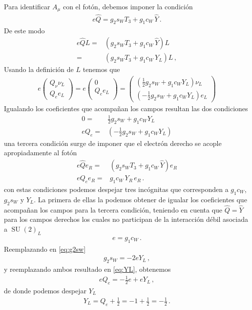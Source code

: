 Para identificar $A_{\mu}$ con el fotón, debemos imponer la condición
\begin{align}
  \label{eq:relgn}
e\widehat{Q}=g_2 s_W T_3+{g_1}c_W\,\widehat{Y}\,.
\end{align}
De este modo
\begin{align}
  e\widehat{Q}L =& \left(g_2 s_W T_3+{g_1}c_W\,\widehat{Y}\right) L \nonumber\\
=& \left(g_2 s_W T_3+{g_1}c_W\,Y_L\right) L \,,
\end{align}
Usando la definición de $L$ tenemos que
\begin{align}
 e
  \begin{pmatrix}
    Q_{\nu} \nu_L\\
       Q_e e_L 
 \end{pmatrix}=
    e\begin{pmatrix}
   0\\
      Q_e e_L \\
  \end{pmatrix}=
  \begin{pmatrix}
   \left( \frac{1}{2}g_2 s_W +g_1 c_W Y_L \right) \nu_L\\ 
 \left(  -\frac{1}{2}g_2 s_W +g_1 c_W Y_L \right) e_L
  \end{pmatrix}
\end{align}
Igualando los coeficientes que acompañan los campos resultan las dos condiciones
\begin{align}
  \label{eq:g2sw}
  0= & \frac{1}{2}g_2 s_W +g_1 c_W Y_L  \\
    \label{eq:YL}
e Q_e=& \left(  -\frac{1}{2}g_2 s_W +g_1 c_W Y_L \right)
\end{align}
una tercera condición surge de imponer que el electrón derecho se acople apropiadamente al fotón
\begin{align}
  \label{eq:erel}
 e\widehat{Q} e_R =& \left(g_2 s_W T_3+{g_1}c_W\,\widehat{Y}\right) e_R\nonumber\\  
e Q_e e_R=& g_1 c_W\,Y_R \, e_R\,.
\end{align}
con estas condiciones podemos despejar tres incógnitas que corresponden a $g_1c_W$, $g_2s_W$ y $Y_L$.
La primera de ellas la podemos obtener de 
igualar los coeficientes que acompañan los campos para la tercera condición, teniendo en cuenta que $\widehat{Q}=\widehat{Y}$ para los campos derechos los cuales no participan de la interacción
débil asociada a $\operatorname{SU}(2)_L$
\begin{align}
  e=g_1 c_W\,.
\end{align}
Reemplazando en \eqref{eq:g2sw}
\begin{align}
  g_2 s_W = -2e Y_L\,,
\end{align}
y reemplazando ambos resultado en \eqref{eq:YL}, obtenemos
\begin{align}
  eQ_e=-\frac{1}{2} e+eY_L\,,
\end{align}
de donde podemos despejar $Y_L$ 
\begin{align}
  Y_L=Q_e+\frac{1}{2}=-1+\frac{1}{2}=-\frac{1}{2}\,.
\end{align}

